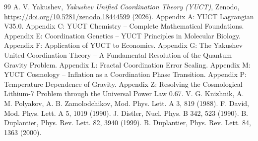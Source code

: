 \documentclass[12pt,a4paper]{article}
\begin{document}
	\begin{thebibliography}{99}
		A. V. Yakushev, \emph{Yakushev Unified Coordination Theory (YUCT)}, Zenodo, \url{https://doi.org/10.5281/zenodo.18444599} (2026).
		Appendix A: YUCT Lagrangian V35.0.
		Appendix C: YUCT Chemistry – Complete Mathematical Foundations.
		Appendix E: Coordination Genetics – YUCT Principles in Molecular Biology.
		Appendix F: Application of YUCT to Economics.
		Appendix G: The Yakushev United Coordination Theory – A Fundamental Resolution of the Quantum Gravity Problem.
		Appendix L: Fractal Coordination Error Scaling.
		Appendix M: YUCT Cosmology – Inflation as a Coordination Phase Transition.
		Appendix P: Temperature Dependence of Gravity.
		Appendix Z: Resolving the Cosmological Lithium-7 Problem through the Universal Power Law 0.67.
		V. G. Knizhnik, A. M. Polyakov, A. B. Zamolodchikov, Mod. Phys. Lett. A 3, 819 (1988).
		F. David, Mod. Phys. Lett. A 5, 1019 (1990).
		J. Distler, Nucl. Phys. B 342, 523 (1990).
		B. Duplantier, Phys. Rev. Lett. 82, 3940 (1999).
		B. Duplantier, Phys. Rev. Lett. 84, 1363 (2000).
	\end{thebibliography}
	
\end{document}
